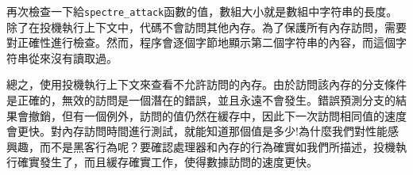 再次檢查一下給\texttt{spectre\_attack}函數的值，數組大小就是數組中字符串的長度。除了在投機執行上下文中，代碼不會訪問其他內存。為了保護所有內存訪問，需要對正確性進行檢查。然而，程序會逐個字節地顯示第二個字符串的內容，而這個字符串從來沒有讀取過。

總之，使用投機執行上下文來查看不允許訪問的內存。由於訪問該內存的分支條件是正確的，無效的訪問是一個潛在的錯誤，並且永遠不會發生。錯誤預測分支的結果會撤銷，但有一個例外，訪問的值仍然在緩存中，因此下一次訪問相同值的速度會更快。對內存訪問時間進行測試，就能知道那個值是多少!為什麼我們對性能感興趣，而不是黑客行為呢？要確認處理器和內存的行為確實如我們所描述，投機執行確實發生了，而且緩存確實工作，使得數據訪問的速度更快。



















